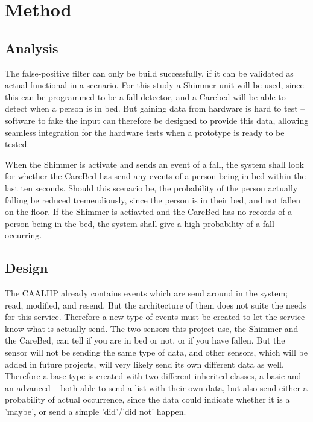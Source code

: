 \section{Method}


\vspace{-10pt}
\subsection{Analysis}
\vspace{-15pt}

The false-positive filter can only be build successfully, if it can be validated as actual functional in a scenario.
For this study a Shimmer unit\cite{Shimmer} will be used, since this can be programmed to be a fall detector, and a Carebed will be able to detect when a person is in bed.
But gaining data from hardware is hard to test -- software to fake the input can therefore be designed to provide this data, allowing seamless integration for the hardware tests when a prototype is ready to be tested.

When the Shimmer is activate and sends an event of a fall, the system shall look for whether the CareBed has send any events of a person being in bed within the last ten seconds.
Should this scenario be, the probability of the person actually falling be reduced tremendiously, since the person is in their bed, and not fallen on the floor.
If the Shimmer is actiavted and the CareBed has no records of a person being in the bed, the system shall give a high probability of a fall occurring.

\vspace{-10pt}
\subsection{Design}
\vspace{-15pt}

The CAALHP already contains events which are send around in the system; read, modified, and resend.
But the architecture of them does not suite the needs for this service.
Therefore a new type of events must be created to let the service know what is actually send.
The two sensors this project use, the Shimmer and the CareBed, can tell if you are in bed or not, or if you have fallen.
But the sensor will not be sending the same type of data, and other sensors, which will be added in future projects, will very likely send its own different data as well.
Therefore a base type is created with two different inherited classes, a basic and an advanced -- both able to send a list with their own data, but also send either a probability of actual occurrence, since the data could indicate whether it is a 'maybe', or send a simple 'did'/'did not' happen.

